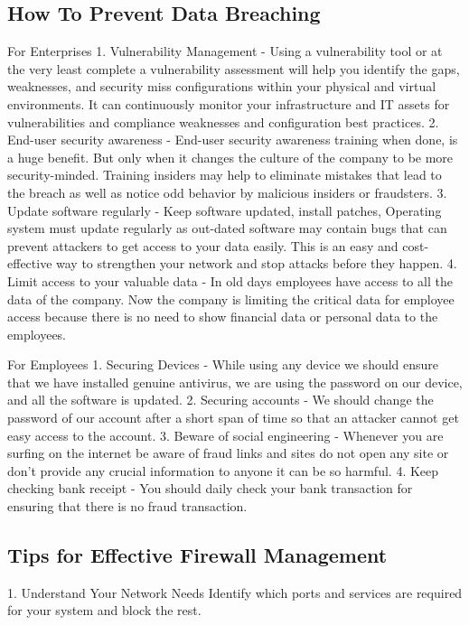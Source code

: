 \subsection{How To Prevent Data Breaching}
For Enterprises
1. Vulnerability Management - Using a vulnerability tool or at the very least complete a vulnerability assessment will help you identify the gaps, weaknesses, and security miss configurations within your physical and virtual environments. It can continuously monitor your infrastructure and IT assets for vulnerabilities and compliance weaknesses and configuration best practices.
2. End-user security awareness - End-user security awareness training when done, is a huge benefit. But only when it changes the culture of the company to be more security-minded. Training insiders may help to eliminate mistakes that lead to the breach as well as notice odd behavior by malicious insiders or fraudsters.
3. Update software regularly - Keep software updated, install patches, Operating system must update regularly as out-dated software may contain bugs that can prevent attackers to get access to your data easily. This is an easy and cost-effective way to strengthen your network and stop attacks before they happen.
4. Limit access to your valuable data - In old days employees have access to all the data of the company. Now the company is limiting the critical data for employee access because there is no need to show financial data or personal data to the employees.

For Employees
1. Securing Devices - While using any device we should ensure that we have installed genuine antivirus, we are using the password on our device, and all the software is updated.
2. Securing accounts - We should change the password of our account after a short span of time so that an attacker cannot get easy access to the account.
3. Beware of social engineering - Whenever you are surfing on the internet be aware of fraud links and sites do not open any site or don't provide any crucial information to anyone it can be so harmful.
4. Keep checking bank receipt - You should daily check your bank transaction for ensuring that there is no fraud transaction.

\subsection{Tips for Effective Firewall Management}
1. Understand Your Network Needs
Identify which ports and services are required for your system and block the rest.

